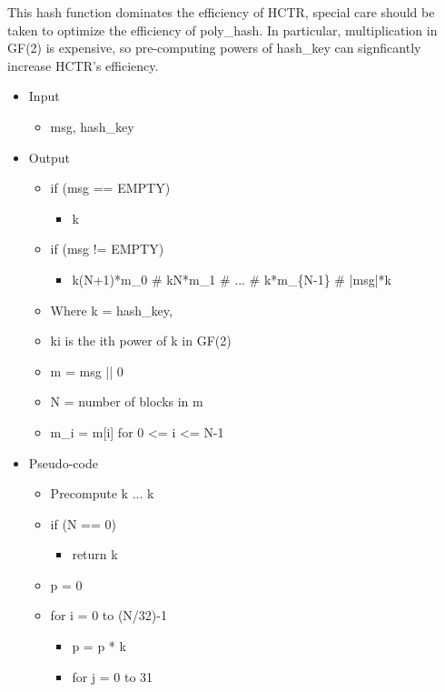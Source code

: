 \documentclass[i-d]{rfc}
\begin{document}
This hash function dominates the efficiency of HCTR, special care should be taken to optimize the efficiency of poly\_hash. In particular, multiplication in GF(2) is expensive, so pre-computing powers of hash\_key can signficantly increase HCTR's efficiency. 
\begin{itemize}
    \item Input
    \begin{itemize}
        \item msg, hash\_key
    \end{itemize}
    \item Output
    \begin{itemize}
        \item if (msg == EMPTY)
        \begin{itemize}
            \item k
        \end{itemize}
        \item if (msg != EMPTY)
        \begin{itemize}
            \item k\pow(N+1)*m\_0 \# k\pow N*m\_1 \# ... \# k*m\_\{N-1\} \# |msg|*k
        \end{itemize}
        \item Where k = hash\_key,
        \item k\pow i is the ith power of k in GF(2)
        \item m = msg || 0\pow *
        \item N = number of blocks in m
        \item m\_i = m[i] for 0 <= i <= N-1
    \end{itemize}
    \item Pseudo-code
    \begin{itemize}
        \item Precompute k ... k
        \item if (N == 0)
        \begin{itemize}
            \item return k
        \end{itemize}
        \item p = 0
        \item for i = 0 to (N/32)-1
        \begin{itemize}
            \item p = p * k
            \item for j = 0 to 31
            \begin{itemize}

\end{itemize}
\end{itemize}
\end{itemize}
\end{itemize}
\end{document}
